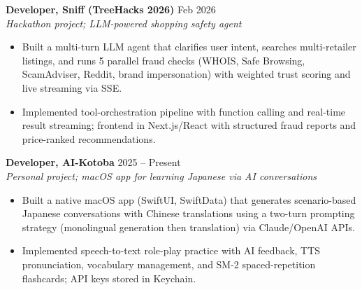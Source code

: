 
\textbf{Developer, Sniff (TreeHacks 2026)} \hfill Feb 2026\\
\textit{Hackathon project; LLM-powered shopping safety agent}
\begin{itemize}
  \item Built a multi-turn LLM agent that clarifies user intent, searches multi-retailer listings, and runs 5 parallel fraud checks (WHOIS, Safe Browsing, ScamAdviser, Reddit, brand impersonation) with weighted trust scoring and live streaming via SSE.
  \item Implemented tool-orchestration pipeline with function calling and real-time result streaming; frontend in Next.js/React with structured fraud reports and price-ranked recommendations.
\end{itemize}

\textbf{Developer, AI-Kotoba} \hfill 2025 -- Present\\
\textit{Personal project; macOS app for learning Japanese via AI conversations}
\begin{itemize}
  \item Built a native macOS app (SwiftUI, SwiftData) that generates scenario-based Japanese conversations with Chinese translations using a two-turn prompting strategy (monolingual generation then translation) via Claude/OpenAI APIs.
  \item Implemented speech-to-text role-play practice with AI feedback, TTS pronunciation, vocabulary management, and SM-2 spaced-repetition flashcards; API keys stored in Keychain.
\end{itemize}
